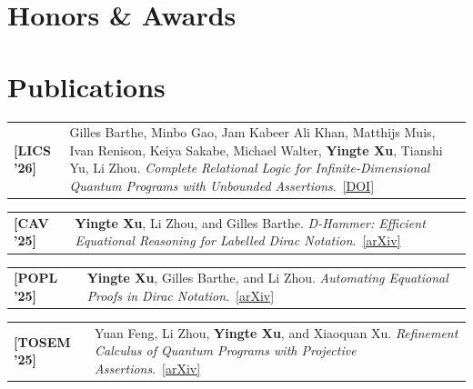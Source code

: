 \documentclass[11pt,a4paper]{moderncv}
\makeatletter
\newcommand*{\publication}[2]{%
  \begin{tabular*}{\maincolumnwidth}{%
    @{}p{2.6cm}@{}>{\raggedright\arraybackslash}p{\dimexpr\maincolumnwidth-2.6cm\relax}@{}}%
    {\bfseries #1} & #2\\%
  \end{tabular*}%
  \par\addvspace{.5em}}
\makeatother
\begin{document}
{}

\section{Honors \& Awards}


{
}





\section{Publications}

\publication{[LICS '26]}{Gilles Barthe, Minbo Gao, Jam Kabeer Ali Khan, Matthijs Muis, Ivan Renison, Keiya Sakabe, Michael Walter, \textbf{Yingte Xu}, Tianshi Yu, Li Zhou. \emph{Complete Relational Logic for Infinite-Dimensional Quantum Programs with Unbounded Assertions}.~\href{https://drops.dagstuhl.de/entities/document/10.4230/LIPIcs.LICS.2026.15}{[DOI]}}

\publication{[CAV '25]}{\textbf{Yingte Xu}, Li Zhou, and Gilles Barthe. \emph{D-Hammer: Efficient Equational Reasoning for Labelled Dirac Notation}.~\href{https://arxiv.org/abs/2505.08633}{[arXiv]}}

\publication{[POPL '25]}{\textbf{Yingte Xu}, Gilles Barthe, and Li Zhou. \emph{Automating Equational Proofs in Dirac Notation}.~\href{https://arxiv.org/abs/2411.11617}{[arXiv]}}

\publication{[TOSEM '25]}{Yuan Feng, Li Zhou, \textbf{Yingte Xu}, and Xiaoquan Xu. \emph{Refinement Calculus of Quantum Programs with Projective Assertions}.~\href{https://arxiv.org/abs/2311.14215}{[arXiv]}}
\end{document}
